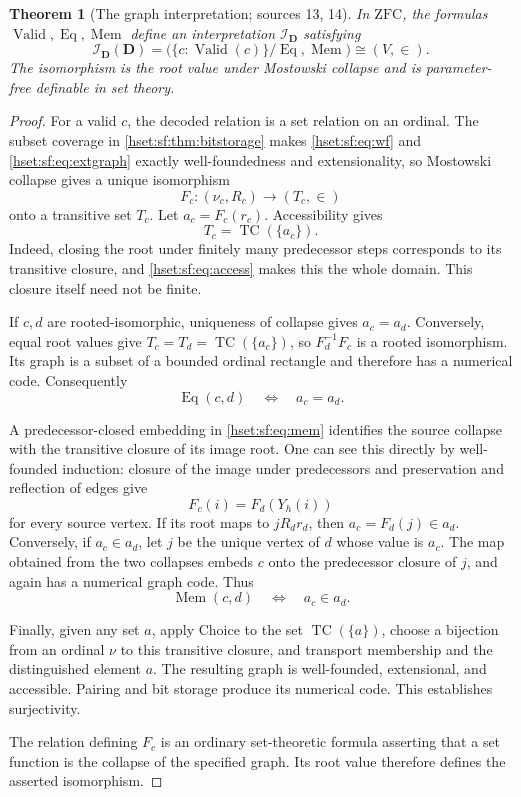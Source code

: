 \documentclass[11pt,letterpaper]{article}
\newtheorem{theorem}{Theorem}[section]
\theoremstyle{definition}
\theoremstyle{remark}
\newcommand{\TC}{\operatorname{TC}}
\newcommand{\I}{\mathcal I}
\newcommand{\ZFC}{\mathrm{ZFC}}
\newcommand{\Valid}{\operatorname{Valid}}
\newcommand{\Eqc}{\operatorname{Eq}}
\newcommand{\Memc}{\operatorname{Mem}}
\newcommand{\Dd}{\mathbf{D}}
\begin{document}
\begin{theorem}[The graph interpretation; sources 13, 14]\label{hset:sf:thm:graph}
In $\ZFC$, the formulas $\Valid,\Eqc,\Memc$ define an interpretation $\I_{\Dd}$
satisfying
\[
 \I_{\Dd}(\Dd)=\bigl(\{c:\Valid(c)\}/\Eqc,\Memc\bigr)\cong(V,\in).
\]
The isomorphism is the root value under Mostowski collapse and is parameter-free
definable in set theory.
\end{theorem}
\begin{proof}
For a valid $c$, the decoded relation is a set relation on an ordinal. The subset
coverage in \cref{hset:sf:thm:bitstorage} makes
\eqref{hset:sf:eq:wf} and \eqref{hset:sf:eq:extgraph} exactly well-foundedness
and extensionality, so Mostowski collapse gives a unique isomorphism
\[
 F_c:(\nu_c,R_c)\longrightarrow(T_c,\in)
\]
onto a transitive set $T_c$. Let $a_c=F_c(r_c)$. Accessibility gives
\[
 T_c=\TC(\{a_c\}).
\]
Indeed, closing the root under finitely many predecessor steps corresponds to its
transitive closure, and \eqref{hset:sf:eq:access} makes this the whole domain.
This closure itself need not be finite.

If $c,d$ are rooted-isomorphic, uniqueness of collapse gives $a_c=a_d$.
Conversely, equal root values give $T_c=T_d=\TC(\{a_c\})$, so $F_d^{-1}F_c$ is a
rooted isomorphism. Its graph is a subset of a bounded ordinal rectangle and
therefore has a numerical code. Consequently
\[
 \Eqc(c,d)\quad\Longleftrightarrow\quad a_c=a_d.
\]

A predecessor-closed embedding in \eqref{hset:sf:eq:mem} identifies the source
collapse with the transitive closure of its image root. One can see this directly
by well-founded induction: closure of the image under predecessors and
preservation and reflection of edges give
\[
 F_c(i)=F_d(Y_h(i))
\]
for every source vertex. If its root maps to $jR_dr_d$, then $a_c=F_d(j)\in a_d$.
Conversely, if $a_c\in a_d$, let $j$ be the unique vertex of $d$ whose value is
$a_c$. The map obtained from the two collapses embeds $c$ onto the predecessor
closure of $j$, and again has a numerical graph code. Thus
\[
 \Memc(c,d)\quad\Longleftrightarrow\quad a_c\in a_d.
\]

Finally, given any set $a$, apply Choice to the set $\TC(\{a\})$, choose a
bijection from an ordinal $\nu$ to this transitive closure, and transport
membership and the distinguished element $a$. The resulting graph is
well-founded, extensional, and accessible. Pairing and bit storage produce its
numerical code. This establishes surjectivity.

The relation defining $F_c$ is an ordinary set-theoretic formula asserting that a
set function is the collapse of the specified graph. Its root value therefore
defines the asserted isomorphism.
\end{proof}
\end{document}
